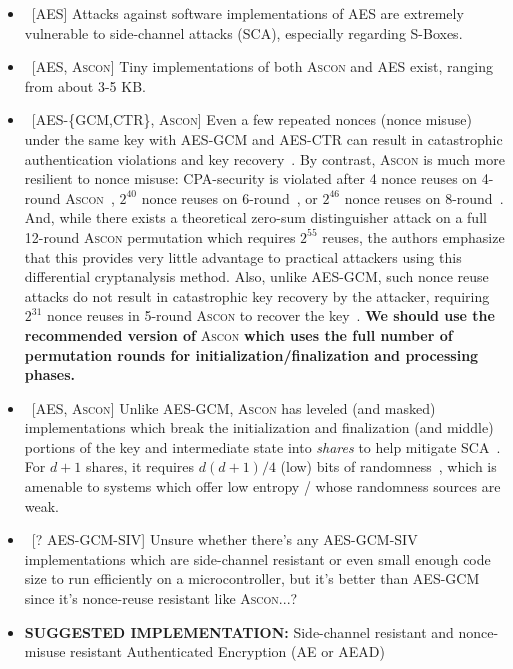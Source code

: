 \begin{itemize}
\begin{itemize}
        \item\ [\xmark\xmark\xmark AES] Attacks against software implementations of AES are extremely vulnerable to side-channel attacks (SCA), especially regarding S-Boxes.
        \item\ [\cmark AES, \cmark A\textsc{scon}] Tiny implementations of both A\textsc{scon} and AES exist, ranging from about 3-5 KB.
        \item\ [\xmark AES-\{GCM,CTR\}, \cmark A\textsc{scon}] Even a few repeated nonces (nonce misuse) under the same key with AES-GCM and AES-CTR can result in catastrophic authentication violations and key recovery~\cite{USENIX:BZDSJ16}. By contrast, A\textsc{scon} is much more resilient to nonce misuse: CPA-security is violated after 4 nonce reuses on 4-round A\textsc{scon}~\cite{EPRINT:HuPey22}, $2^{40}$ nonce reuses on 6-round~\cite{BCP22}, or $2^{46}$ nonce reuses on 8-round~\cite{EPRINT:HuPey22}. And, while there exists a theoretical zero-sum distinguisher attack on a full 12-round A\textsc{scon} permutation which requires $2^{55}$ reuses, the authors emphasize that this provides very little advantage to practical attackers using this differential cryptanalysis method. Also, unlike AES-GCM, such nonce reuse attacks do not result in catastrophic key recovery by the attacker, requiring $2^{31}$ nonce reuses in 5-round A\textsc{scon} to recover the key~\cite{EPRINT:Tezcan20}. \textbf{We should use the recommended version of} A\textsc{scon} \textbf{which uses the full number of permutation rounds for initialization/finalization and processing phases.}
        \item\ [\xmark AES, \cmark A\textsc{scon}] Unlike AES-GCM, A\textsc{scon} has leveled (and masked) implementations which break the initialization and finalization (and middle) portions of the key and intermediate state into \emph{shares} to help mitigate SCA~\cite{EPRINT:DDEGMP19}. For $d+1$ shares, it requires $d(d+1)/4$ (low) bits of randomness~\cite{JCEng:GroMan18}, which is amenable to systems which offer low entropy / whose randomness sources are weak.
        \item\ [? AES-GCM-SIV] Unsure whether there's any AES-GCM-SIV implementations which are side-channel resistant or even small enough code size to run efficiently on a microcontroller, but it's better than AES-GCM since it's nonce-reuse resistant like A\textsc{scon}...?
        \item \textbf{SUGGESTED IMPLEMENTATION:} Side-channel resistant and nonce-misuse resistant Authenticated Encryption (AE or AEAD)

\end{itemize}
\end{itemize}
